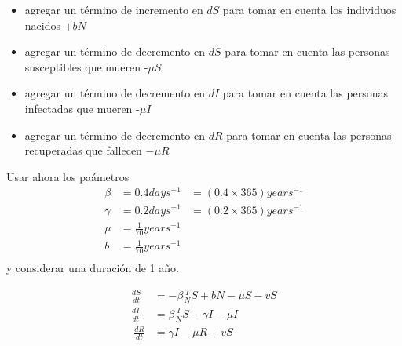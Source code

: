 \documentclass[
]{article}
\begin{document}
\begin{itemize}
\item
  agregar un término de incremento en \(dS\) para tomar en cuenta los
  individuos nacidos \(+bN\)
\item
  agregar un término de decremento en \(dS\) para tomar en cuenta las
  personas susceptibles que mueren -\(\mu S\)
\item
  agregar un término de decremento en \(dI\) para tomar en cuenta las
  personas infectadas que mueren -\(\mu I\)
\item
  agregar un término de decremento en \(dR\) para tomar en cuenta las
  personas recuperadas que fallecen \(-\mu R\)
\end{itemize}

Usar ahora los paámetros \[
\begin{aligned}
\beta  &=  0.4 days^{-1} &= (0.4 \times 365) years^{-1}\\
\gamma &=  0.2 days^{-1} &= (0.2 \times 365) years^{-1}\\
\mu    &=  \frac{1}{70}years^{-1}\\
b     &=  \frac{1}{70}years^{-1}\\
\end{aligned}
\] y considerar una duración de 1 año.

\[
\begin{aligned}
\frac{dS}{dt}&= -\beta \frac{I}{N} S+bN-\mu S-vS\\
\frac{dI}{dt}&= \beta\frac{I}{N}S-\gamma I-\mu I\\\
\frac{dR}{dt}&= \gamma I-\mu R+vS
\end{aligned}
\]
\end{document}

